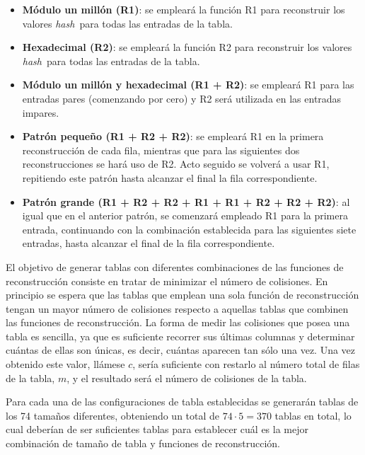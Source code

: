 \documentclass[12pt,spanish,listoffigures,listoftables]{tfgetsinf}
\newcommand{\hash}{\textit{hash}}
\begin{document}
\begin{itemize}

    \item \textbf{Módulo un millón (R1)}: se empleará la función R1 para reconstruir los valores \hash~para todas las entradas de la tabla.
    
    \item \textbf{Hexadecimal (R2)}: se empleará la función R2 para reconstruir los valores \hash~para todas las entradas de la tabla.
    
    \item \textbf{Módulo un millón y hexadecimal (R1 + R2)}: se empleará R1 para las entradas pares (comenzando por cero) y R2 será utilizada en las entradas impares.
    
    \item \textbf{Patrón pequeño (R1 + R2 + R2)}: se empleará R1 en la primera reconstrucción de cada fila, mientras que para las siguientes dos reconstrucciones se hará uso de R2. Acto seguido se volverá a usar R1, repitiendo este patrón hasta alcanzar el final la fila correspondiente.
    
    \item \textbf{Patrón grande (R1 + R2 + R2 + R1 + R1 + R2 + R2 + R2)}: al igual que en el anterior patrón, se comenzará empleado R1 para la primera entrada, continuando con la combinación establecida para las siguientes siete entradas, hasta alcanzar el final de la fila correspondiente.
    
\end{itemize}

El objetivo de generar tablas con diferentes combinaciones de las funciones de reconstrucción consiste en tratar de minimizar el número de colisiones. En principio se espera que las tablas que emplean una sola función de reconstrucción tengan un mayor número de colisiones respecto a aquellas tablas que combinen las funciones de reconstrucción. La forma de medir las colisiones que posea una tabla es sencilla, ya que es suficiente recorrer sus últimas columnas y determinar cuántas de ellas son únicas, es decir, cuántas aparecen tan sólo una vez. Una vez obtenido este valor, llámese $c$, sería suficiente con restarlo al número total de filas de la tabla, $m$, y el resultado será el número de colisiones de la tabla.

Para cada una de las configuraciones de tabla establecidas se generarán tablas de los 74 tamaños diferentes, obteniendo un total de $74 \cdot 5 = 370$ tablas en total, lo cual deberían de ser suficientes tablas para establecer cuál es la mejor combinación de tamaño de tabla y funciones de reconstrucción.
\end{document}
